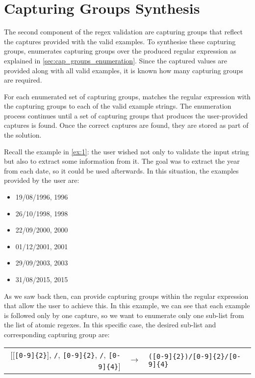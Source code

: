 \section{Capturing Groups Synthesis}
The second component of the regex validation are capturing groups that reflect the captures provided with the valid examples. To synthesise these capturing groups, \Forest enumerates capturing groups over the produced regular expression as explained in \autoref{sec:cap_groups_enumeration}. Since the captured values are provided along with all valid examples, it is known how many capturing groups are required.

For each enumerated set of capturing groups, \Forest matches the regular expression with the capturing groups to each of the valid example strings. The enumeration process continues until a set of capturing groups that produces the user-provided captures is found. Once the correct captures are found, they are stored as part of the solution.

\begin{example}
Recall the example in \autoref{ex:1}: the user wished not only to validate the input string but also to extract some information from it. The goal was to extract the year from each date, so it could be used afterwards. In this situation, the examples provided by the user are:
%
\begin{multicols}{3}
    \begin{itemize}[label={},topsep=0em]
    \item 19/08/1996, 1996
    \item 26/10/1998, 1998
    \item 22/09/2000, 2000
    \item 01/12/2001, 2001
    \item 29/09/2003, 2003
    \item 31/08/2015, 2015
    \end{itemize}
\end{multicols}
%
As we saw back then, \Forest can provide capturing groups within the regular expression that allow the user to achieve this. In this example, we can see that each example is followed only by one capture, so we want to enumerate only one sub-list from the list of atomic regexes. In this specific case, the desired sub-list and corresponding capturing group are:
%
\begin{center}
\begin{tabular}{rcl}
[[\verb![0-9]{2}!], \verb!/!, \verb![0-9]{2}!, \verb!/!, \verb![0-9]{4}!] & $\rightarrow$ & \verb!([0-9]{2})/[0-9]{2}/[0-9]{4}!
\end{tabular}\bigskip
\end{center}
\end{example}


